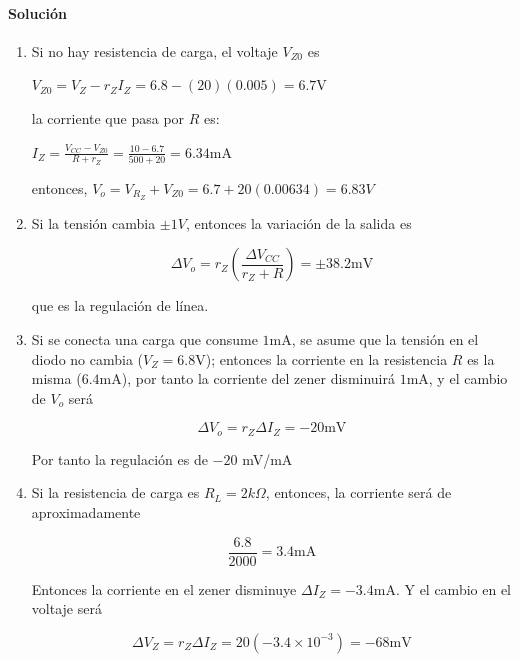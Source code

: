 \paragraph{Solución}

\begin{enumerate}
    \item Si no hay resistencia de carga, el voltaje $V_{Z0}$ es

    $V_{Z0} = V_Z - r_ZI_Z = 6.8 - (20)(0.005)=6.7 \text{V}$
    
    la corriente que pasa por \(R\) es:

    \(I_Z = \frac{V_{CC}-V_{Z0}}{R+r_Z} = \frac{10-6.7}{500+20} = 6.34 \text{mA}\)

    entonces, $V_o = V_{R_Z}+V_{Z0} = 6.7+20(0.00634)=6.83 V$

    \item Si la tensión cambia $\pm1V$, entonces la variación de la salida es

    \begin{equation*}
        \Delta V_o = r_Z \left( \frac{\Delta V_{CC}}{r_Z + R} \right) = \pm 38.2 \text{mV}
    \end{equation*}

    que es la regulación de línea.

    \item Si se conecta una carga que consume $1\text{mA}$, se asume que la tensión en el diodo no cambia ($V_Z = 6.8$V); entonces la corriente en la resistencia $R$ es la misma ($6.4$mA), por tanto la corriente del zener disminuirá $1$mA, y el cambio de $V_o$ será

    \begin{equation*}
        \Delta V_o = r_Z \Delta I_{Z} = -20 \text{mV}
    \end{equation*}

    Por tanto la regulación es de $-20$ mV/mA

    \item Si la resistencia de carga es $R_L=2 k\Omega$, entonces, la corriente será de aproximadamente 

    \begin{equation*}
        \frac{6.8}{2000} = 3.4\text{mA}
    \end{equation*}

    Entonces la corriente en el zener disminuye $\Delta I_Z = -3.4\text{mA}$. Y el cambio en el voltaje será 

    \begin{equation*}
        \Delta V_Z = r_Z \Delta I_Z = 20(-3.4\times 10^{-3}) = -68 \text{mV}
    \end{equation*}


\end{enumerate}
